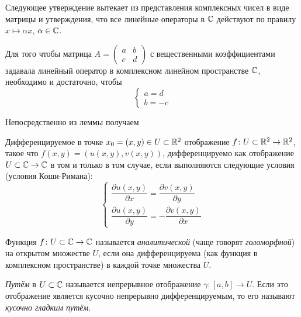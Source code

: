 Следующее утверждение вытекает из представления комплексных чисел в виде матрицы и утверждения,
что все линейные операторы в $\mathbb{C}$ действуют по правилу $x \mapsto \alpha x$, 
$\alpha \in \mathbb{C}$.

\begin{lemma}
    Для того чтобы матрица $A = \begin{pmatrix}
    a & b \\
    c & d 
    \end{pmatrix}$ с вещественными коэффициентами задавала
    линейный оператор в комплексном линейном пространстве $\mathbb{C}$, необходимо и достаточно, чтобы
    \[ \left\{\begin{array}{l}
        a = d \\
        b = -c
        \end{array}\right.\]
\end{lemma}

Непосредственно из леммы получаем
\begin{theorem}
    Дифференцируемое в точке $x_0 = (x, y) \in U \subset \mathbb{R}^2$ 
    отображение $f \colon U \subset \mathbb{R}^2 \to \mathbb{R}^2$, такое что
    $f(x, y) = (u(x, y), v(x, y))$,
    дифференцируемо как отображение $U \subset \mathbb{C} \to \mathbb{C}$ в том и только в том случае, если выполняются следующие условия (условия Коши-Римана):
    \[ \left\{\begin{array}{l}
        \dfrac{\partial u(x, y)}{\partial x} 
            = \dfrac{\partial v(x, y)}{\partial y} \\
        \dfrac{\partial u(x, y)}{\partial y}
            = -\dfrac{\partial v(x, y)}{\partial x}
        \end{array}\right. \]
\end{theorem}

\begin{definition}
    Функция $f \colon U \subset \mathbb{C} \to \mathbb{C}$ называется \emph{аналитической} 
    (чаще говорят \emph{голоморфной}) на открытом множестве $U$, если она дифференцируема 
    (как функция в комплексном пространстве) 
    в каждой точке множества $U$. 
\end{definition}

\begin{definition}
    \emph{Путём} в $U \subset \mathbb{C}$ называется непрерывное отображение
    $\gamma \colon [a, b] \to U$. Если это отображение является кусочно непрерывно
    дифференцируемым, то его называют \emph{кусочно гладким путём}.
\end{definition}

